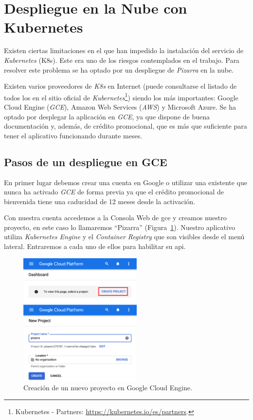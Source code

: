 \documentclass[11pt,spanish,listoffigures,listoftables]{tfgetsinf}
\begin{document}
\section{Despliegue en la Nube con Kubernetes}

Existen ciertas limitaciones en el  \kahan que han impedido la instalación del servicio de \textit{Kubernetes} (K8s). Este era uno de los riesgos contemplados en el trabajo. Para resolver este problema se ha optado por un despliegue de \textit{Pizarra} en la nube. 

Existen varios proveedores de \textit{K8s} en Internet (puede consultarse el listado de todos los  en el sitio oficial de \textit{Kubernetes}\footnote{Kubernetes - Partners: \url{https://kubernetes.io/es/partners}.}) siendo los más importantes: Google Cloud Engine (\textit{GCE}), Amazon Web Services (\textit{AWS}) y Microsoft Azure. Se ha optado por desplegar la aplicación en \textit{GCE}, ya que dispone de buena documentación y, además,  de crédito promocional, que es más que suficiente para tener el aplicativo funcionando durante meses.

\subsection{Pasos de un despliegue en GCE}

En primer lugar debemos crear una cuenta en Google o utilizar una existente que nunca ha activado \textit{GCE} de forma previa ya que el crédito promocional de bienvenida tiene una caducidad de 12 meses desde la activación.

Con nuestra cuenta accedemos a la Consola Web de \acrshort{gce} y creamos nuestro proyecto, en este caso lo llamaremos ``Pizarra'' (Figura~\ref{figura:gce-new-project}). Nuestro aplicativo utiliza \textit{Kubernetes Engine} y el \textit{Container Registry} que son visibles desde el menú lateral. Entraremos a cada uno de ellos para habilitar su \acrshort{api}.

\begin{figure}[ht]
	\centering
	\includegraphics[width=0.55\textwidth]{img/gce-new-project}
	\caption[nuevo proyecto en GCE]{Creación de un nuevo proyecto en Google Cloud Engine.}
	\label{figura:gce-new-project}
\end{figure}
\end{document}
